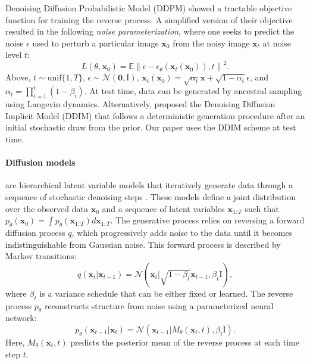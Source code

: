 Denoising Diffusion Probabilistic Model (DDPM) \cite{Ho2020} showed a tractable objective function for training the reverse process. A simplified version of their objective resulted in the following \textit{noise parameterization}, where one seeks to predict the noise $\epsilon$ used to perturb a particular image $\boldsymbol{x}_0$ from the noisy image $\boldsymbol{x}_t$ at noise level $t$:
\begin{equation}
    L\left(\theta,\boldsymbol{x}_0\right)=\mathbb{E}\left\|\epsilon-\epsilon_\theta\left(\boldsymbol{x}_t\left(\boldsymbol{x}_0\right)\right),t\right\|^2.
\end{equation}
Above, $t\sim\textrm{unif}\{1,T\}$, $\epsilon\sim \mathcal{N}\left(\boldsymbol{0},\boldsymbol{\mathrm{I}}\right)$, $\boldsymbol{x}_t\left(\boldsymbol{x}_0\right)=\sqrt{\alpha_t}\boldsymbol{x}+\sqrt{1-\alpha_t}\epsilon$, and $\alpha_t=\prod_{i=1}^t\left(1-\beta_i\right)$. At test time, data can be generated by ancestral sampling using Langevin dynamics. Alternatively, \cite{Song2021} proposed the Denoising Diffusion Implicit Model (DDIM) that follows a deterministic generation procedure after an initial stochastic draw from the prior. Our paper uses the DDIM scheme at test time.

\paragraph{\textbf{Diffusion models}} are hierarchical latent variable models that iteratively generate data through a sequence of stochastic denoising steps \cite{Sohl2015,Yang2019,Ho2020,Song2021}. These models define a joint distribution over the observed data $\boldsymbol{x}_0$ and a sequence of latent variables $\boldsymbol{x}_{1:T}$ such that $p_\theta\left(\boldsymbol{x}_0\right)=\int p_\theta\left(\boldsymbol{x}_{1:T}\right)d\boldsymbol{x}_{1:T}$. The generative process relies on reversing a forward diffusion process $q$, which progressively adds noise to the data until it becomes indistinguishable from Gaussian noise. This forward process is described by Markov transitions:
\begin{equation}\label{eq:forward}
    q\left(\boldsymbol{x}_t|\boldsymbol{x}_{t-1}\right)=\mathcal{N}\left(\boldsymbol{x}_t|\sqrt{1-\beta_t}\boldsymbol{x}_{t-1},\beta_t\boldsymbol{\mathrm{I}}\right),
\end{equation}
where $\beta_t$ is a variance schedule that can be either fixed or learned. The reverse process $p_\theta$ reconstructs structure from noise using a parameterized neural network:
\begin{equation}\label{eq:reverse}
    p_\theta\left(\boldsymbol{x}_{t-1}|\boldsymbol{x}_t\right)=\mathcal{N}\left(\boldsymbol{x}_{t-1}|M_\theta\left(\boldsymbol{x}_t,t\right),\beta_t\boldsymbol{\mathrm{I}}\right).
\end{equation}
Here, $M_\theta\left(\boldsymbol{x}_t,t\right)$ predicts the posterior mean of the reverse process at each time step $t$.

